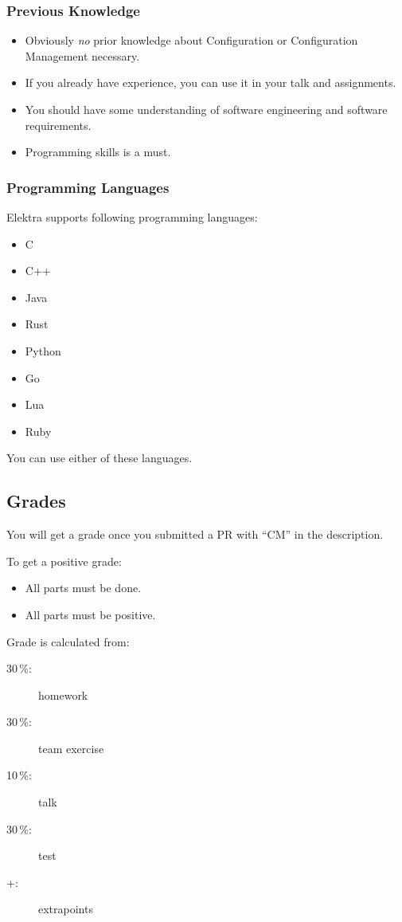 \begin{frame}
	\frametitle{Previous Knowledge}
	\begin{itemize}
		\item Obviously \textit{no} prior knowledge about Configuration or Configuration Management necessary.
		\item If you already have experience, you can use it in your talk and assignments.
		\item You should have some understanding of software engineering and software requirements.
		\item Programming skills is a must.
	\end{itemize}
\end{frame}

\begin{frame}
	\frametitle{Programming Languages}
	Elektra supports following programming languages:
	\begin{itemize}
		\item C
		\item C++
		\item Java
		\item Rust
		\item Python
		\item Go
		\item Lua
		\item Ruby
	\end{itemize}
	You can use either of these languages.
\end{frame}

\subsection{Grades}

\begin{frame}
	You will get a grade once you submitted a PR with ``CM'' in the description.
	\vspace{1cm}

	To get a positive grade:
	\begin{itemize}
		\item All parts must be done.
		\item All parts must be positive.
	\end{itemize}
\end{frame}

\begin{frame}
	Grade is calculated from:
	\begin{description}
	\item[30\,\%:] homework
	\item[30\,\%:] team exercise
	\item[10\,\%:] talk
	\item[30\,\%:] test
	\item[+:] extrapoints
	\end{description}
\end{frame}

